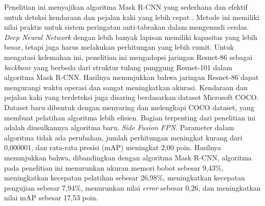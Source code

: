 Penelitian ini menyajikan algoritma Mask R-CNN yang sederhana dan efektif untuk deteksi kendaraan dan pejalan kaki yang lebih cepat \citep{fast-vehicle}. Metode ini memiliki nilai praktis untuk sistem peringatan anti-tabrakan dalam mengemudi cerdas. \textit{Deep Neural Network} dengan lebih banyak lapisan memiliki kapasitas yang lebih besar, tetapi juga harus melakukan perhitungan yang lebih rumit. Untuk mengatasi kelemahan ini, penelitian ini mengadopsi jaringan Resnet-86 sebagai \textit{backbone} yang berbeda dari struktur tulang punggung Resnet-101 dalam algoritma Mask R-CNN. Hasilnya menunjukkan bahwa jaringan Resnet-86 dapat mengurangi waktu operasi dan sangat meningkatkan akurasi. Kendaraan dan pejalan kaki yang terdeteksi juga disaring berdasarkan dataset Microsoft COCO. Dataset baru dibentuk dengan menyaring dan melengkapi COCO dataset, yang membuat pelatihan algoritma lebih efisien. Bagian terpenting dari penelitian ini adalah diusulkannya algoritma baru, \textit{Side Fusion FPN}. Parameter dalam algoritma tidak ada perubahan, jumlah perhitungan meningkat kurang dari 0,000001, dan rata-rata presisi (mAP) meningkat 2,00 poin. Hasilnya menunjukkan bahwa, dibandingkan dengan algoritma Mask R-CNN, algoritma pada penelitian ini menurunkan ukuran memori bobot sebesar 9,43\%, meningkatkan kecepatan pelatihan sebesar 26,98\%, meningkatkan kecepatan pengujian sebesar 7,94\%, menurunkan nilai \textit{error} sebesar 0,26, dan meningkatkan nilai mAP sebesar 17,53 poin.
